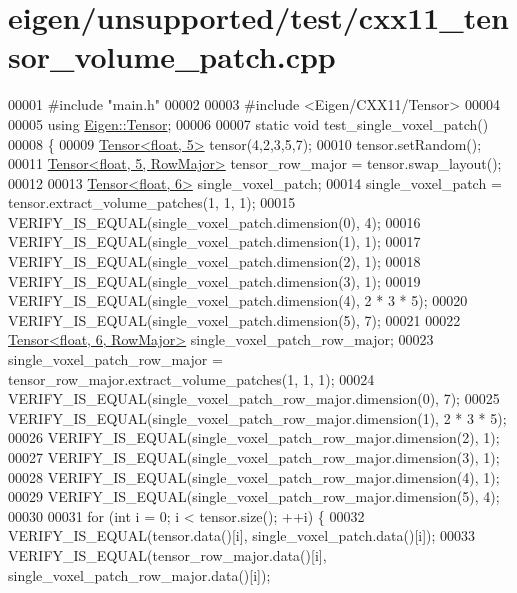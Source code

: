 \hypertarget{eigen_2unsupported_2test_2cxx11__tensor__volume__patch_8cpp_source}{}\section{eigen/unsupported/test/cxx11\+\_\+tensor\+\_\+volume\+\_\+patch.cpp}
\label{eigen_2unsupported_2test_2cxx11__tensor__volume__patch_8cpp_source}

\begin{DoxyCode}
00001 \textcolor{preprocessor}{#include "main.h"}
00002 
00003 \textcolor{preprocessor}{#include <Eigen/CXX11/Tensor>}
00004 
00005 \textcolor{keyword}{using} \hyperlink{class_eigen_1_1_tensor}{Eigen::Tensor};
00006 
00007 \textcolor{keyword}{static} \textcolor{keywordtype}{void} test\_single\_voxel\_patch()
00008 \{
00009   \hyperlink{class_eigen_1_1_tensor}{Tensor<float, 5>} tensor(4,2,3,5,7);
00010   tensor.setRandom();
00011   \hyperlink{class_eigen_1_1_tensor}{Tensor<float, 5, RowMajor>} tensor\_row\_major = tensor.swap\_layout();
00012 
00013   \hyperlink{class_eigen_1_1_tensor}{Tensor<float, 6>} single\_voxel\_patch;
00014   single\_voxel\_patch = tensor.extract\_volume\_patches(1, 1, 1);
00015   VERIFY\_IS\_EQUAL(single\_voxel\_patch.dimension(0), 4);
00016   VERIFY\_IS\_EQUAL(single\_voxel\_patch.dimension(1), 1);
00017   VERIFY\_IS\_EQUAL(single\_voxel\_patch.dimension(2), 1);
00018   VERIFY\_IS\_EQUAL(single\_voxel\_patch.dimension(3), 1);
00019   VERIFY\_IS\_EQUAL(single\_voxel\_patch.dimension(4), 2 * 3 * 5);
00020   VERIFY\_IS\_EQUAL(single\_voxel\_patch.dimension(5), 7);
00021 
00022   \hyperlink{class_eigen_1_1_tensor}{Tensor<float, 6, RowMajor>} single\_voxel\_patch\_row\_major;
00023   single\_voxel\_patch\_row\_major = tensor\_row\_major.extract\_volume\_patches(1, 1, 1);
00024   VERIFY\_IS\_EQUAL(single\_voxel\_patch\_row\_major.dimension(0), 7);
00025   VERIFY\_IS\_EQUAL(single\_voxel\_patch\_row\_major.dimension(1), 2 * 3 * 5);
00026   VERIFY\_IS\_EQUAL(single\_voxel\_patch\_row\_major.dimension(2), 1);
00027   VERIFY\_IS\_EQUAL(single\_voxel\_patch\_row\_major.dimension(3), 1);
00028   VERIFY\_IS\_EQUAL(single\_voxel\_patch\_row\_major.dimension(4), 1);
00029   VERIFY\_IS\_EQUAL(single\_voxel\_patch\_row\_major.dimension(5), 4);
00030 
00031   \textcolor{keywordflow}{for} (\textcolor{keywordtype}{int} i = 0; i < tensor.size(); ++i) \{
00032     VERIFY\_IS\_EQUAL(tensor.data()[i], single\_voxel\_patch.data()[i]);
00033     VERIFY\_IS\_EQUAL(tensor\_row\_major.data()[i], single\_voxel\_patch\_row\_major.data()[i]);

\end{DoxyCode}
